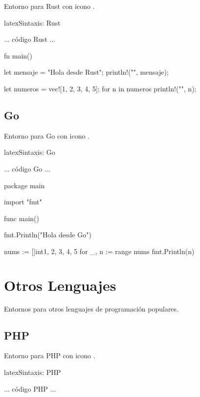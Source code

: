 Entorno para Rust con icono .

\begin{codigosimple}{latex}{Sintaxis: Rust}
\begin{rustcode}
  ... código Rust ...
\end{rustcode}
\end{codigosimple}

\begin{rustcode}
fn main() {
    let mensaje = "Hola desde Rust";
    println!("{}", mensaje);

    let numeros = vec![1, 2, 3, 4, 5];
    for n in numeros {
        println!("{}", n);
    }
}
\end{rustcode}

\subsection{Go}

Entorno para Go con icono .

\begin{codigosimple}{latex}{Sintaxis: Go}
\begin{gocode}
  ... código Go ...
\end{gocode}
\end{codigosimple}

\begin{gocode}
package main

import "fmt"

func main() {
    fmt.Println("Hola desde Go")

    nums := []int{1, 2, 3, 4, 5}
    for _, n := range nums {
        fmt.Println(n)
    }
}
\end{gocode}

\section{Otros Lenguajes}
\label{sec:otros}

Entornos para otros lenguajes de programación populares.

\subsection{PHP}

Entorno para PHP con icono .

\begin{codigosimple}{latex}{Sintaxis: PHP}
\begin{phpcode}
  ... código PHP ...
\end{phpcode}
\end{codigosimple}

